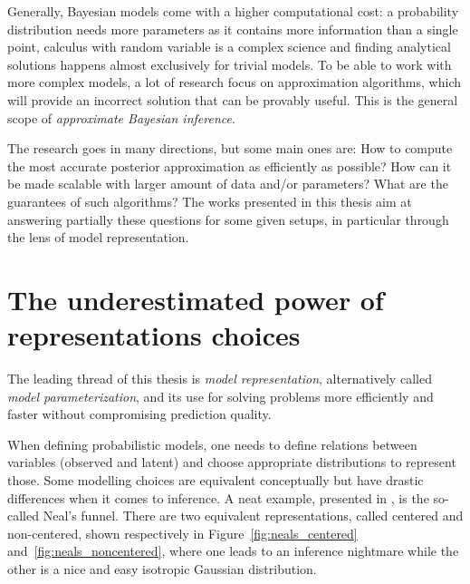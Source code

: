 Generally, Bayesian models come with a higher computational cost: a probability distribution needs more parameters as it contains more information than a single point, calculus with random variable is a complex science and finding analytical solutions happens almost exclusively for trivial models.
To be able to work with more complex models, a lot of research focus on approximation algorithms, which will provide an incorrect solution that can be provably useful.
This is the general scope of \textit{approximate Bayesian inference}.

The research goes in many directions, but some main ones are: How to compute the most accurate posterior approximation as efficiently as possible? How can it be made scalable with larger amount of data and/or parameters? What are the guarantees of such algorithms?
The works presented in this thesis aim at answering partially these questions for some given setups, in particular through the lens of model representation.

\section{The underestimated power of representations choices}

The leading thread of this thesis is \textit{model representation}, alternatively called \textit{model parameterization}, and its use for solving problems more efficiently and faster without compromising prediction quality.

When defining probabilistic models, one needs to define relations between variables (observed and latent) and choose appropriate distributions to represent those.
Some modelling choices are equivalent conceptually but have drastic differences when it comes to inference.
A neat example, presented in \citet{gorinovaAutomaticReparameterisationProbabilistic2020}, is the so-called Neal's funnel.
There are two equivalent representations, called centered and non-centered, shown respectively in Figure~\ref{fig:neals_centered} and~\ref{fig:neals_noncentered}, where one leads to an inference nightmare while the other is a nice and easy isotropic Gaussian distribution.

